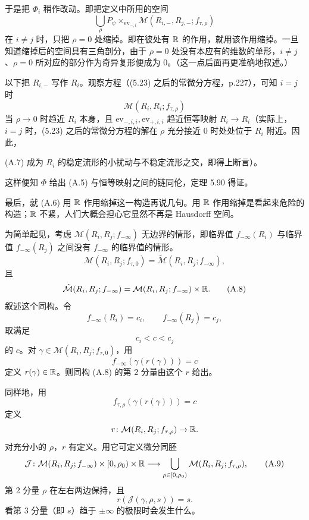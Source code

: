 
于是把 $\Phi_i$ 稍作改动。即把定义中所用的空间
\begin{equation}
  \bigcup_\rho P_\psi\times_{\mathrm{ev}_{-,i}}
  \mathcal{M}(R_{i,-},R_{j,-};f_{\tau,\rho}) \tag{A.6}
\end{equation}
在 $i\ne j$ 时，只把 $\rho=0$ 处缩掉。即在彼处有 $\mathbb{R}$ 的作用，就用该作用缩掉。一旦知道缩掉后的空间具有三角剖分，由于 $\rho=0$ 处没有本应有的维数的单形，$i\ne j$、$\rho=0$ 所对应的部分作为奇异复形便成为 $0$。（这一点后面再更准确地叙述。）

以下把 $R_{i,-}$ 写作 $R_i$。观察方程（(5.23) 之后的常微分方程，p.227），可知 $i=j$ 时
\begin{equation}
  \mathcal{M}(R_i,R_i;f_{\tau,\rho}) \tag{A.7}
\end{equation}
当 $\rho\to0$ 时趋近 $R_i$ 本身，且 $\mathrm{ev}_{-,i,i},\mathrm{ev}_{+,i,i}$ 趋近恒等映射 $R_i\to R_i$（实际上，$i=j$ 时，(5.23) 之后的常微分方程的解在 $\rho$ 充分接近 $0$ 时处处位于 $R_i$ 附近。因此，

(A.7) 成为 $R_i$ 的稳定流形的小扰动与不稳定流形之交，即得上断言）。

这样便知 $\Phi$ 给出 (A.5) 与恒等映射之间的链同伦，定理 5.90 得证。

最后，就 (A.6) 用 $\mathbb{R}$ 作用缩掉这一构造再说几句。用 $\mathbb{R}$ 作用缩掉是看起来危险的构造；$\mathbb{R}$ 不紧，人们大概会担心它显然不再是 Hausdorff 空间。

为简单起见，考虑 $\mathcal{M}(R_i,R_j;f_{-\infty})$ 无边界的情形，即临界值 $f_{-\infty}(R_i)$ 与临界值 $f_{-\infty}(R_j)$ 之间没有 $f_{-\infty}$ 的临界值的情形。
\[
  \mathcal{M}(R_i,R_j;f_{\tau,0})
  =\tilde{\mathcal{M}}(R_i,R_j;f_{-\infty}),
\]
且
\begin{equation}
  \tilde{\mathcal{M}}(R_i,R_j;f_{-\infty})
  =\mathcal{M}(R_i,R_j;f_{-\infty})\times\mathbb{R} . \tag{A.8}
\end{equation}
叙述这个同构。令
\[
  f_{-\infty}(R_i)=c_i,\qquad f_{-\infty}(R_j)=c_j,
\]
取满足
\[
  c_i<c<c_j
\]
的 $c$。对 $\gamma\in\mathcal{M}(R_i,R_j;f_{\tau,0})$，用
\[
  f_{-\infty}(\gamma(r(\gamma)))=c
\]
定义 $r(\gamma)\in\mathbb{R}$。则同构 (A.8) 的第 2 分量由这个 $r$ 给出。

同样地，用
\[
  f_{\tau,\rho}(\gamma(r(\gamma)))=c
\]
定义
\[
  r\colon\mathcal{M}(R_i,R_j;f_{\tau,\rho})\to\mathbb{R} .
\]
对充分小的 $\rho$，$r$ 有定义。用它可定义微分同胚
\begin{equation}
  \mathcal{J}\colon\mathcal{M}(R_i,R_j;f_{-\infty})\times[0,\rho_0)\times\mathbb{R}
  \longrightarrow\bigcup_{\rho\in[0,\rho_0)}\mathcal{M}(R_i,R_j;f_{\tau,\rho}), \tag{A.9}
\end{equation}
第 2 分量 $\rho$ 在左右两边保持，且
\[
  r(\mathcal{J}(\gamma,\rho,s))=s .
\]
看第 3 分量（即 $s$）趋于 $\pm\infty$ 的极限时会发生什么。

